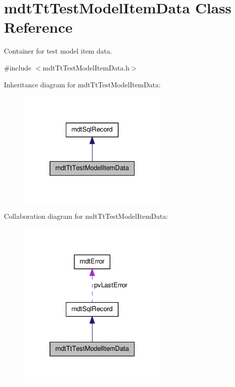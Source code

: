 \hypertarget{classmdt_tt_test_model_item_data}{\section{mdt\-Tt\-Test\-Model\-Item\-Data Class Reference}
\label{classmdt_tt_test_model_item_data}
}


Container for test model item data.  




{\ttfamily \#include $<$mdt\-Tt\-Test\-Model\-Item\-Data.\-h$>$}



Inheritance diagram for mdt\-Tt\-Test\-Model\-Item\-Data\-:\nopagebreak
\begin{figure}[H]
\begin{center}
\leavevmode
\includegraphics[width=208pt]{classmdt_tt_test_model_item_data__inherit__graph}
\end{center}
\end{figure}


Collaboration diagram for mdt\-Tt\-Test\-Model\-Item\-Data\-:\nopagebreak
\begin{figure}[H]
\begin{center}
\leavevmode
\includegraphics[width=208pt]{classmdt_tt_test_model_item_data__coll__graph}
\end{center}
\end{figure}
